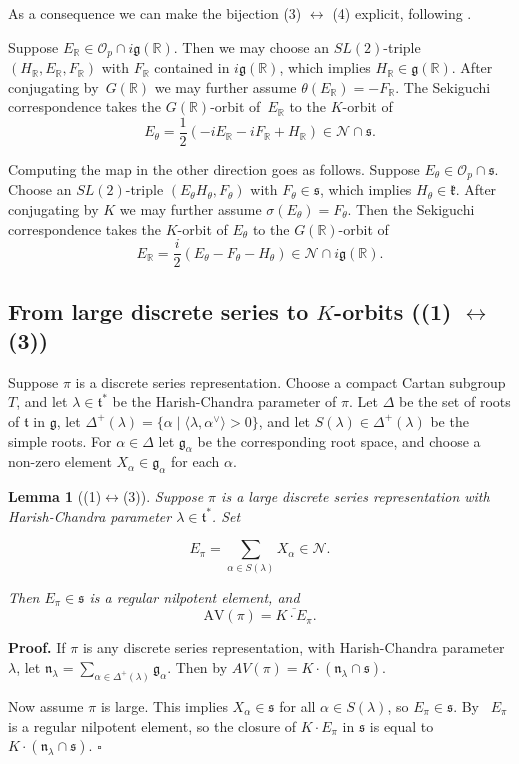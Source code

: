 \documentclass[10pt,leqno]{article}
\newtheorem{lemma}[equation]{Lemma}
\newcommand{\qed}{\hfill $\square$ \medskip}
\newenvironment{proof}[1][Proof]{\noindent\textbf{#1.} }{\qed}
\renewcommand{\O}{\mathcal O}
\newcommand{\R}{\mathbb R}
\newcommand{\N}{\mathcal N}
\newcommand{\n}{\mathfrak n}
\renewcommand{\k}{\mathfrak k}
\newcommand{\ch}[1]{#1^\vee}
\renewcommand{\t}{\mathfrak t}
\newcommand{\g}{\mathfrak g}
\newcommand{\s}{\mathfrak s}
\newcommand{\AV}{\mathrm{AV}}
\newcommand{\Op}{\O_p}
\begin{document}
As a consequence we can make the bijection (3) $\leftrightarrow$ (4) explicit, following \cite[Section~1]{avav}.


Suppose $E_\R\in \Op\cap i\g(\R)$. Then we may choose an $SL(2)$-triple $(H_\R,E_\R,F_\R)$ with $F_\R$  contained in $i\g(\R)$,
which implies $H_\R\in \g(\R)$. 
After conjugating by~$G(\R)$ we may further assume $\theta(E_\R)=-F_\R$.
The Sekiguchi correspondence takes the $G(\R)$-orbit of~$E_\R$ to the $K$-orbit of
$$
E_\theta=\frac12(-iE_\R-iF_\R+H_\R)\in \N\cap \s.
$$


Computing the map in the other direction goes as follows.
Suppose $E_\theta\in \Op\cap\s$. Choose an $SL(2)$-triple  $(E_\theta H_\theta,F_\theta)$ with
$F_\theta\in\s$, which implies $H_\theta\in\k$. After conjugating by $K$ we may further assume $\sigma(E_\theta)=F_\theta$.
Then the Sekiguchi correspondence takes the $K$-orbit of $E_\theta$ to the $G(\R)$-orbit of 
$$
E_\R=\frac i2(E_\theta-F_\theta-H_\theta)\in\N\cap i\g(\R).
$$


\subsection{From large discrete series to $K$-orbits ((1) $\leftrightarrow$ (3))}

Suppose $\pi$ is a  discrete series representation. Choose a compact Cartan subgroup $T$, and let
$\lambda\in\t^*$ be the Harish-Chandra parameter of $\pi$. Let $\Delta$ be the set of roots of $\t$ in $\g$, 
let $\Delta^+(\lambda)=\{\alpha\mid \langle\lambda,\ch\alpha\rangle>0\}$,
and let $S(\lambda)\in\Delta^+(\lambda)$ be the simple roots.
For $\alpha\in \Delta$ let $\g_\alpha$ be the corresponding root space, and choose a non-zero element $X_\alpha\in\g_\alpha$ for each $\alpha$.

\begin{lemma}[(1)$\leftrightarrow$(3)]\label{l:pi_to_av}
Suppose $\pi$ is a large discrete series representation with Harish-Chandra parameter $\lambda\in\t^*$.
Set

\begin{equation}
  \label{e:Epi}
  E_\pi=\sum_{\alpha\in S(\lambda)}X_\alpha\in \N.
\end{equation}

Then $E_\pi\in\s$ is a regular nilpotent element, and
$$
\AV(\pi)=\overline{K\cdot E_\pi}.
$$
\end{lemma}

\begin{proof}
If $\pi$ is any discrete series representation, with Harish-Chandra parameter $\lambda$, let
$\n_{\lambda}=\sum_{\alpha\in\Delta^+(\lambda)}\g_\alpha$.
Then by \cite[Proposition 6.8]{vogan_irreducibility} $AV(\pi)=K\cdot(\n_\lambda\cap\s)$. 

Now assume $\pi$ is large. This implies $X_\alpha\in\s$ for all $\alpha\in S(\lambda)$, so $E_\pi\in \s$. 
By~\cite{kostant_tds} $E_\pi$ is a regular nilpotent element, so the closure of $K\cdot E_\pi$ in $\s$ is equal to $K\cdot(\n_\lambda\cap\s)$. 
\end{proof}
\end{document}
